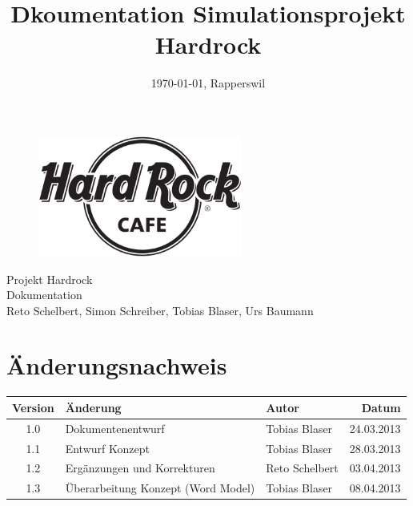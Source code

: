 \documentclass[ngerman,a4paper,12pt]{scrreprt}
\title{Dkoumentation Simulationsprojekt Hardrock}
\date{\today{}, Rapperswil}
\def\author{Reto Schelbert, Simon Schreiber, Tobias Blaser, Urs Baumann}
\begin{document}
\thispagestyle{empty}
\begin{titlepage}
	\begin{center}

	\vspace*{40mm}
	
	\begin{figure}[htp]
		\centering
		\includegraphics[width=0.60\textwidth]{img/Hard-Rock-Cafe-Logo-Black-White.png}
	\end{figure}		
	\vspace*{20mm}
	
	{\fontsize{40}{48} \selectfont Projekt Hardrock \\[10mm]}
	{\fontsize{32}{48} \selectfont Dokumentation \\[5mm]}	
	\vspace*{20mm}
	\author

\end{center}
\end{titlepage}
\clearpage

\chapter*{Änderungsnachweis}
\begin{tabularx}{\textwidth}{|cXlr|} %
		\hline
		\textbf{Version} & \textbf{Änderung} & \textbf{Autor} & \textbf{Datum}\\
		\hline
		1.0 & Dokumentenentwurf & Tobias Blaser & 24.03.2013 \\
		1.1 & Entwurf Konzept & Tobias Blaser & 28.03.2013 \\
		1.2 & Ergänzungen und Korrekturen & Reto Schelbert & 03.04.2013 \\
		1.3 & Überarbeitung Konzept (Word Model) & Tobias Blaser & 08.04.2013 \\
		\hline
\end{tabularx}

\tableofcontents
\end{document}
